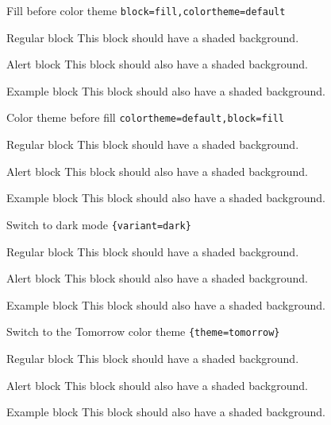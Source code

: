 \documentclass[aspectratio=169]{beamer}
\newcommand{\sampleblocks}{%
  \begin{block}{Regular block}
    This block should have a shaded background.
  \end{block}
  \begin{alertblock}{Alert block}
    This block should also have a shaded background.
  \end{alertblock}
  \begin{exampleblock}{Example block}
    This block should also have a shaded background.
  \end{exampleblock}
}
\begin{document}
\begin{frame}{Fill before color theme}
  \texttt{\small block=fill,colortheme=default}
  \sampleblocks
\end{frame}

\begin{frame}{Color theme before fill}
  \texttt{\small colortheme=default,block=fill}
  \sampleblocks
\end{frame}

\begin{frame}{Switch to dark mode}
  \texttt{\small\string\molochcolors\{variant=dark\}}
  \sampleblocks
\end{frame}

\begin{frame}{Switch to the Tomorrow color theme}
  \texttt{\small\string\molochcolors\{theme=tomorrow\}}
  \sampleblocks
\end{frame}
\end{document}
